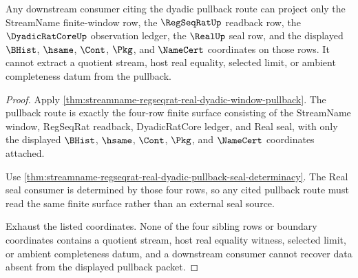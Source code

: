 \begin{theorem}
\label{thm:streamname-regseqrat-real-dyadic-pullback-consumer-exhaustion}
Any downstream consumer citing the dyadic pullback route can project only the
StreamName finite-window row, the $\RegSeqRatUp$ readback row, the
$\DyadicRatCoreUp$ observation ledger, the $\RealUp$ seal row, and the
displayed $\BHist$, $\hsame$, $\Cont$, $\Pkg$, and $\NameCert$ coordinates on
those rows. It cannot extract a quotient stream, host real equality, selected
limit, or ambient completeness datum from the pullback.
\end{theorem}
\begin{proof}
Apply \autoref{thm:streamname-regseqrat-real-dyadic-window-pullback}. The
pullback route is exactly the four-row finite surface consisting of the
StreamName window, RegSeqRat readback, DyadicRatCore ledger, and Real seal,
with only the displayed $\BHist$, $\hsame$, $\Cont$, $\Pkg$, and $\NameCert$
coordinates attached.

Use \autoref{thm:streamname-regseqrat-real-dyadic-pullback-seal-determinacy}.
The Real seal consumer is determined by those four rows, so any cited
pullback route must read the same finite surface rather than an external seal
source.

Exhaust the listed coordinates. None of the four sibling rows or boundary
coordinates contains a quotient stream, host real equality witness, selected
limit, or ambient completeness datum, and a downstream consumer cannot
recover data absent from the displayed pullback packet.
\end{proof}

